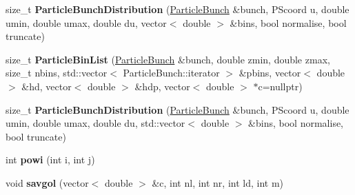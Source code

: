 \begin{DoxyCompactItemize}
\mbox{\label{namespaceParticleTracking_ab0d704b21051a53afdda6e7a9e0d4684}} 
size\+\_\+t {\bfseries Particle\+Bunch\+Distribution} (\hyperlink{classParticleTracking_1_1ParticleBunch}{Particle\+Bunch} \&bunch, P\+Scoord u, double umin, double umax, double du, vector$<$ double $>$ \&bins, bool normalise, bool truncate)
\item 
\mbox{\label{namespaceParticleTracking_ad8ef4f05a6076323fc7d4205160b9b59}} 
size\+\_\+t {\bfseries Particle\+Bin\+List} (\hyperlink{classParticleTracking_1_1ParticleBunch}{Particle\+Bunch} \&bunch, double zmin, double zmax, size\+\_\+t nbins, std\+::vector$<$ Particle\+Bunch\+::iterator $>$ \&pbins, vector$<$ double $>$ \&hd, vector$<$ double $>$ \&hdp, vector$<$ double $>$ $\ast$c=nullptr)
\item 
\mbox{\label{namespaceParticleTracking_aa915f63d6569c1583d8ecc31f3ff02a5}} 
size\+\_\+t {\bfseries Particle\+Bunch\+Distribution} (\hyperlink{classParticleTracking_1_1ParticleBunch}{Particle\+Bunch} \&bunch, P\+Scoord u, double umin, double umax, double du, std\+::vector$<$ double $>$ \&bins, bool normalise, bool truncate)
\item 
\mbox{\label{namespaceParticleTracking_a42d5f2e46dd180c4bf74e4b43c51b29d}} 
int {\bfseries powi} (int i, int j)
\item 
\mbox{\label{namespaceParticleTracking_a847869a43c3de886c4e27a7adfb223c0}} 
void {\bfseries savgol} (vector$<$ double $>$ \&c, int nl, int nr, int ld, int m)
\end{DoxyCompactItemize}
